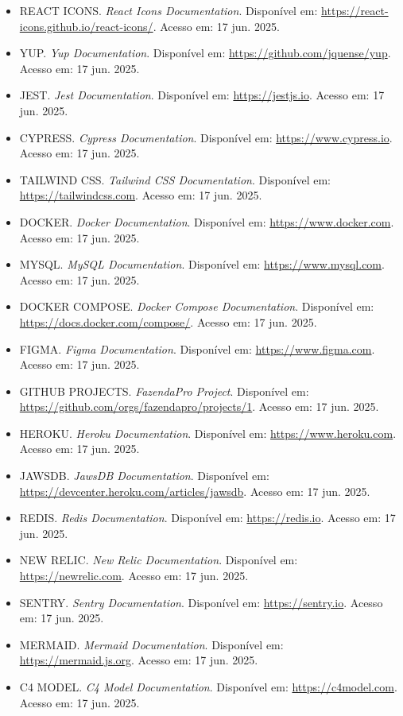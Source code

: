 \documentclass[12pt, a4paper]{article}
\begin{document}
\begin{spacing}{1.5}
\begin{spacing}{1.5}
\begin{itemize}
    \item REACT ICONS. \textit{React Icons Documentation}. Disponível em: \url{https://react-icons.github.io/react-icons/}. Acesso em: 17 jun. 2025.
    \item YUP. \textit{Yup Documentation}. Disponível em: \url{https://github.com/jquense/yup}. Acesso em: 17 jun. 2025.
    \item JEST. \textit{Jest Documentation}. Disponível em: \url{https://jestjs.io}. Acesso em: 17 jun. 2025.
    \item CYPRESS. \textit{Cypress Documentation}. Disponível em: \url{https://www.cypress.io}. Acesso em: 17 jun. 2025.
    \item TAILWIND CSS. \textit{Tailwind CSS Documentation}. Disponível em: \url{https://tailwindcss.com}. Acesso em: 17 jun. 2025.
    \item DOCKER. \textit{Docker Documentation}. Disponível em: \url{https://www.docker.com}. Acesso em: 17 jun. 2025.
    \item MYSQL. \textit{MySQL Documentation}. Disponível em: \url{https://www.mysql.com}. Acesso em: 17 jun. 2025.
    \item DOCKER COMPOSE. \textit{Docker Compose Documentation}. Disponível em: \url{https://docs.docker.com/compose/}. Acesso em: 17 jun. 2025.
    \item FIGMA. \textit{Figma Documentation}. Disponível em: \url{https://www.figma.com}. Acesso em: 17 jun. 2025.
    \item GITHUB PROJECTS. \textit{FazendaPro Project}. Disponível em: \url{https://github.com/orgs/fazendapro/projects/1}. Acesso em: 17 jun. 2025.
    \item HEROKU. \textit{Heroku Documentation}. Disponível em: \url{https://www.heroku.com}. Acesso em: 17 jun. 2025.
    \item JAWSDB. \textit{JawsDB Documentation}. Disponível em: \url{https://devcenter.heroku.com/articles/jawsdb}. Acesso em: 17 jun. 2025.
    \item REDIS. \textit{Redis Documentation}. Disponível em: \url{https://redis.io}. Acesso em: 17 jun. 2025.
    \item NEW RELIC. \textit{New Relic Documentation}. Disponível em: \url{https://newrelic.com}. Acesso em: 17 jun. 2025.
    \item SENTRY. \textit{Sentry Documentation}. Disponível em: \url{https://sentry.io}. Acesso em: 17 jun. 2025.
    \item MERMAID. \textit{Mermaid Documentation}. Disponível em: \url{https://mermaid.js.org}. Acesso em: 17 jun. 2025.
    \item C4 MODEL. \textit{C4 Model Documentation}. Disponível em: \url{https://c4model.com}. Acesso em: 17 jun. 2025.
\end{itemize}
\end{spacing}


\end{spacing}
\end{document}
